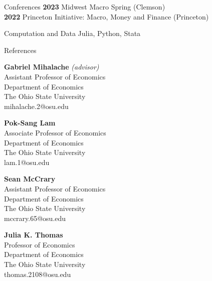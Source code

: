 \documentclass{cv} %
\begin{document}
\bigskip
\begin{rSection}{Conferences}
{\bf 2023} Midwest Macro Spring (Clemson) \\
{\bf 2022} Princeton Initiative: Macro, Money and Finance (Princeton)
\end{rSection}
\bigskip


\begin{rSection}{Computation and Data}
Julia, Python, Stata
\end{rSection}
\bigskip

\begin{rSection}{References} 
\begin{minipage}{6cm}
	{\bf Gabriel Mihalache} \emph{(advisor)} \\
	Assistant Professor of Economics \\
	Department of Economics \\
	The Ohio State University \\
	mihalache.2@osu.edu
\end{minipage}
\begin{minipage}{6cm}
	{\bf Pok-Sang Lam} \\
	Associate Professor of Economics \\
	Department of Economics \\
	The Ohio State University \\
	lam.1@osu.edu
\end{minipage}
\begin{minipage}{6cm}
	{\bf Sean McCrary} \\
	Assistant Professor of Economics \\
	Department of Economics \\
	The Ohio State University \\
	mccrary.65@osu.edu
\end{minipage}

\bigskip
\begin{minipage}{6cm}
	{\bf Julia K. Thomas} \\
	Professor of Economics \\
	Department of Economics \\
	The Ohio State University \\
	thomas.2108@osu.edu
\end{minipage}

\end{rSection}
\end{document}
